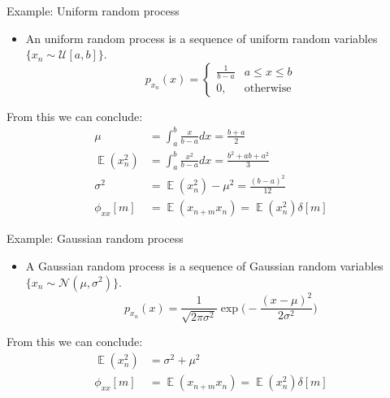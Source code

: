 \documentclass[10pt, handout]{beamer}
\DeclareMathOperator{\E}{\mathbb{E}} %
\begin{document}
\begin{frame}{Example: Uniform random process}
	
	\begin{itemize}
		\item An uniform random process is a sequence of uniform random variables $\{x_n \sim \mathcal{U}[a, b]\}$.
		\begin{equation*}
		p_{x_n}(x) = \begin{cases}
		\displaystyle\frac{1}{b-a} & a\leq x\leq b \\
		0, &\text{otherwise}
		\end{cases}
		\end{equation*}
	\end{itemize}
	From this we can conclude:
	\begin{align*} 
	\mu &= \int_{a}^{b} \frac{x}{b-a}dx = \frac{b+a}{2} \\
	\E(x_n^2) &= \int_{a}^{b} \frac{x^2}{b-a}dx = \frac{b^2+ab+a^2}{3} \\
	\sigma^2 &= \E(x_n^2) - \mu^2 = \frac{(b-a)^2}{12} \\
	\phi_{xx}[m] &=\E(x_{n+m}x_n) = \E(x_n^2)\delta[m] \tag{Assuming IID}
	\end{align*}
\end{frame}

\begin{frame}{Example: Gaussian random process}
	
	\begin{itemize}
		\item A Gaussian random process is a sequence of Gaussian random variables $\{x_n \sim \mathcal{N}(\mu, \sigma^2)\}$.
		\begin{equation*}
		p_{x_n}(x) = \frac{1}{\sqrt{2\pi\sigma^2}}\exp\bigg(-\frac{(x-\mu)^2}{2\sigma^2}\bigg)
		\end{equation*}

	\end{itemize}
	From this we can conclude:
	\begin{align*} 
	\E(x_n^2) &= \sigma^2 + \mu^2 \\
	\phi_{xx}[m] &=\E(x_{n+m}x_n) = \E(x_n^2)\delta[m] \tag{Assuming IID}
	\end{align*}	
\end{frame}

\end{document}
